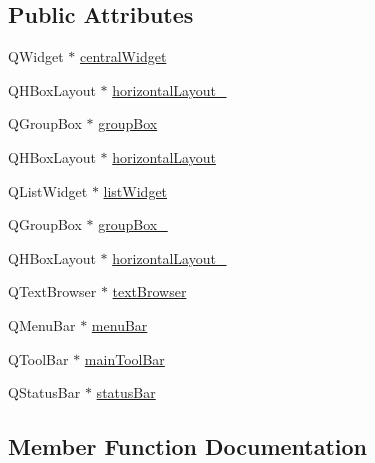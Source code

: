 \subsection*{Public Attributes}
\begin{DoxyCompactItemize}
\item 
Q\+Widget $\ast$ \mbox{\hyperlink{class_ui___main_window_a30075506c2116c3ed4ff25e07ae75f81}{central\+Widget}}
\item 
Q\+H\+Box\+Layout $\ast$ \mbox{\hyperlink{class_ui___main_window_a03ce63974cc69b067c91bbf285cceca8}{horizontal\+Layout\+\_}}
\item 
Q\+Group\+Box $\ast$ \mbox{\hyperlink{class_ui___main_window_aef7cb3be8cecfc9aaf98f036a98781ce}{group\+Box}}
\item 
Q\+H\+Box\+Layout $\ast$ \mbox{\hyperlink{class_ui___main_window_acd6fdc9ebacc4b25b834162380d75ce8}{horizontal\+Layout}}
\item 
Q\+List\+Widget $\ast$ \mbox{\hyperlink{class_ui___main_window_ae647a15635ba8a0e5d5aec475db99d8f}{list\+Widget}}
\item 
Q\+Group\+Box $\ast$ \mbox{\hyperlink{class_ui___main_window_abb28acde35ffce4d0e6152579df2cbc3}{group\+Box\+\_}}
\item 
Q\+H\+Box\+Layout $\ast$ \mbox{\hyperlink{class_ui___main_window_a80867018070156432923d0266cc9fe25}{horizontal\+Layout\+\_}}
\item 
Q\+Text\+Browser $\ast$ \mbox{\hyperlink{class_ui___main_window_a2c789c07fa5fc1cee05aae8df52bb02d}{text\+Browser}}
\item 
Q\+Menu\+Bar $\ast$ \mbox{\hyperlink{class_ui___main_window_a2be1c24ec9adfca18e1dcc951931457f}{menu\+Bar}}
\item 
Q\+Tool\+Bar $\ast$ \mbox{\hyperlink{class_ui___main_window_a5172877001c8c7b4e0f6de50421867d1}{main\+Tool\+Bar}}
\item 
Q\+Status\+Bar $\ast$ \mbox{\hyperlink{class_ui___main_window_a50fa481337604bcc8bf68de18ab16ecd}{status\+Bar}}
\end{DoxyCompactItemize}


\subsection{Member Function Documentation}
\mbox{\label{class_ui___main_window_a097dd160c3534a204904cb374412c618}} 
